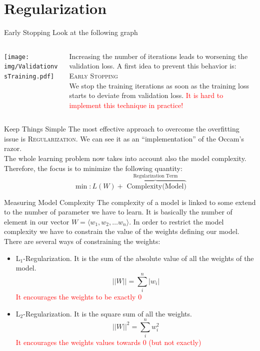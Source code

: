 \documentclass{beamer}
\begin{document}
\section{Regularization}
\begin{frame}
\tableofcontents[currentsection]
\end{frame}

\begin{frame}{Early Stopping}
Look at the following graph
\begin{columns}
\begin{column}{0.5\textwidth}
\texttt{[image: img/ValidationvsTraining.pdf]}
\end{column}
\begin{column}{0.5\textwidth}
Increasing the number of iterations leads to
worsening the validation loss.
\pause
\vskip 0.8cm
A first idea to prevent this behavior is:\\[1pt]
\textsc{Early Stopping}\\
We stop the training iterations as soon as the training loss
starts to deviate from validation loss.
\vskip 0.5cm
\pause
\textcolor{red}{It is hard to implement this technique in practice!}
\end{column}
\end{columns}
\end{frame}

\begin{frame}{Keep Things Simple}
The most effective approach to overcome the overfitting issue is
\textsc{Regularization}.
\vskip 0.8cm
We can see it as an ``implementation'' of the Occam's razor.\\
The whole learning problem now takes into account also
the model complexity. Therefore, the focus is to minimize the following quantity:
\[
\min: L(W) + \overbrace{\text{ Complexity(Model)}}^{\text{Regularization Term}}
\]

\end{frame}

\begin{frame}{Measuring Model Complexity}
The complexity of a model is linked to some extend to the number of parameter
we have to learn.
It is basically the number of element in our vector $W = \langle w_1,w_2,\dots w_n \rangle$.
In order to restrict the model complexity we have to constrain the value of the weights defining our model. 
\pause
\vskip 0.3cm
There are several ways of constraining the weights:
\begin{itemize}
\pause
\item L$_1$-Regularization. It is the sum of the absolute value of all the weights of the model.
\[
	||W|| = \sum_{i}^{n} |w_i|
\]
\pause
\textcolor{red}{It encourages the weights to be exactly 0}
\pause
\item L$_2$-Regularization. It is the square sum of all the weights.
\[
||W||^2 = \sum_{i}^{n} w_i^2
\]
\pause
\textcolor{red}{It encourages the weights values towards 0 (but not exactly)}
\end{itemize}
\end{frame}
\end{document}
